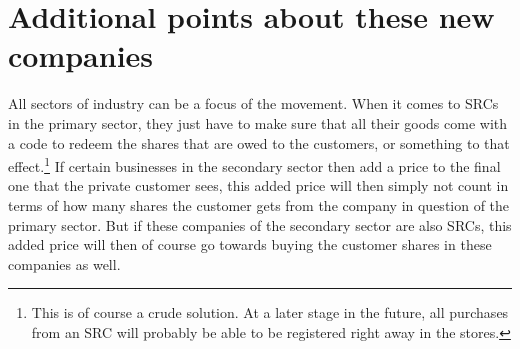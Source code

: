 \documentclass{article}
\begin{document}



\section{Additional points about these new companies}


All sectors of industry can be a focus of the movement. When it comes to SRCs in the primary sector, they just have to make sure that all their goods come with a code to redeem the shares that are owed to the customers, or something to that effect.\footnote{
	This is of course a crude solution. At a later stage in the future, all purchases from an SRC will probably be able to be registered right away in the stores. %
} 
If certain businesses in the secondary sector then add a price to the final one that the private customer sees, this added price will then simply not count in terms of how many shares the customer gets from the company in question of the primary sector. But if these companies of the secondary sector are also SRCs, this added price will then of course go towards buying the customer shares in these companies as well. %
\end{document}
